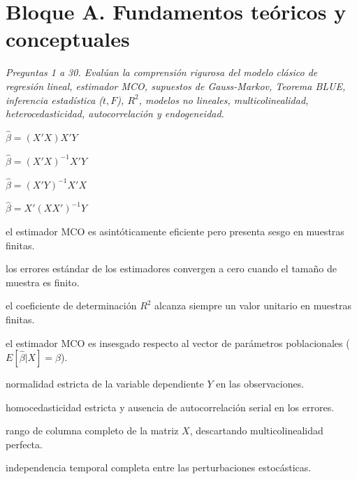 \section*{Bloque A. Fundamentos teóricos y conceptuales}

\noindent\textit{Preguntas 1 a 30. Evalúan la comprensión rigurosa del modelo clásico de regresión lineal, estimador MCO, supuestos de Gauss-Markov, Teorema BLUE, inferencia estadística ($t, F$), $R^2$, modelos no lineales, multicolinealidad, heterocedasticidad, autocorrelación y endogeneidad.}

\begin{opts}
    \item $\hat{\beta} = (X'X) X'Y$
    \item $\hat{\beta} = (X'X)^{-1} X'Y$
    \item $\hat{\beta} = (X'Y)^{-1} X'X$
    \item $\hat{\beta} = X'(XX')^{-1} Y$
\end{opts}

\begin{opts}
    \item el estimador MCO es asintóticamente eficiente pero presenta sesgo en muestras finitas.
    \item los errores estándar de los estimadores convergen a cero cuando el tamaño de muestra es finito.
    \item el coeficiente de determinación $R^2$ alcanza siempre un valor unitario en muestras finitas.
    \item el estimador MCO es insesgado respecto al vector de parámetros poblacionales ($E[\hat{\beta}|X] = \beta$).
\end{opts}

\begin{opts}
    \item normalidad estricta de la variable dependiente $Y$ en las observaciones.
    \item homocedasticidad estricta y ausencia de autocorrelación serial en los errores.
    \item rango de columna completo de la matriz $X$, descartando multicolinealidad perfecta.
    \item independencia temporal completa entre las perturbaciones estocásticas.
\end{opts}

